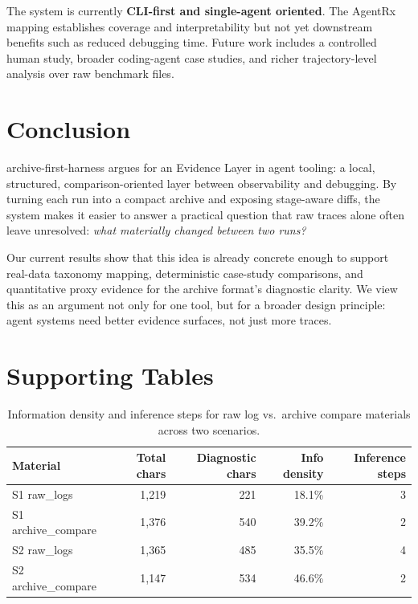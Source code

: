\documentclass[11pt]{article}
\begin{document}
The system is currently \textbf{CLI-first and single-agent oriented}. The AgentRx mapping establishes coverage and interpretability but not yet downstream benefits such as reduced debugging time. Future work includes a controlled human study, broader coding-agent case studies, and richer trajectory-level analysis over raw benchmark files.

\section{Conclusion}

archive-first-harness argues for an Evidence Layer in agent tooling: a local, structured, comparison-oriented layer between observability and debugging. By turning each run into a compact archive and exposing stage-aware diffs, the system makes it easier to answer a practical question that raw traces alone often leave unresolved: \emph{what materially changed between two runs?}

Our current results show that this idea is already concrete enough to support real-data taxonomy mapping, deterministic case-study comparisons, and quantitative proxy evidence for the archive format's diagnostic clarity. We view this as an argument not only for one tool, but for a broader design principle: agent systems need better evidence surfaces, not just more traces.




\appendix

\section{Supporting Tables}
\label{app:case-studies}

\begin{table}[t!]
  \centering
  \small
  \begin{tabular}{lrrrr}
    \toprule
    \textbf{Material} & \textbf{Total chars} & \textbf{Diagnostic chars} & \textbf{Info density} & \textbf{Inference steps} \\
    \midrule
    S1 raw\_logs         & 1,219 & 221 & 18.1\% & 3 \\
    S1 archive\_compare  & 1,376 & 540 & 39.2\% & 2 \\
    S2 raw\_logs         & 1,365 & 485 & 35.5\% & 4 \\
    S2 archive\_compare  & 1,147 & 534 & 46.6\% & 2 \\
    \bottomrule
  \end{tabular}
  \caption{Information density and inference steps for raw log vs.\ archive compare materials across two scenarios.}
  \label{tab:info-density}
\end{table}
\end{document}
